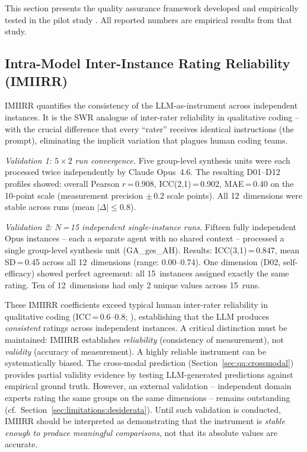 \documentclass[11pt,a4paper]{article}
\begin{document}
This section presents the quality assurance framework developed and empirically tested in the pilot study \citep{Geiger2026PaperA}. All reported numbers are empirical results from that study.


\subsection{Intra-Model Inter-Instance Rating Reliability (IMIIRR)}
\label{sec:qa:imiirr}

IMIIRR quantifies the consistency of the LLM-as-instrument across independent instances. It is the SWR analogue of inter-rater reliability in qualitative coding -- with the crucial difference that every ``rater'' receives identical instructions (the prompt), eliminating the implicit variation that plagues human coding teams.

\emph{Validation 1: $5 \times 2$ run convergence.} Five group-level synthesis units were each processed twice independently by Claude Opus~4.6. The resulting D01--D12 profiles showed: overall Pearson $r$\,=\,0.908, ICC(2,1)\,=\,0.902, MAE\,=\,0.40 on the 10-point scale (measurement precision $\pm$\,0.2 scale points). All 12~dimensions were stable across runs (mean $|\Delta| \leq 0.8$).

\emph{Validation 2: $N$\,=\,15 independent single-instance runs.} Fifteen fully independent Opus instances -- each a separate agent with no shared context -- processed a single group-level synthesis unit (GA\_ges\_AH). Results: ICC(3,1)\,=\,0.847, mean SD\,=\,0.45 across all 12~dimensions (range: 0.00--0.74). One dimension (D02, self-efficacy) showed perfect agreement: all 15~instances assigned exactly the same rating. Ten of 12~dimensions had only 2 unique values across 15~runs.

These IMIIRR coefficients exceed typical human inter-rater reliability in qualitative coding (ICC\,=\,0.6--0.8; \citealp{Hallgren2012}), establishing that the LLM produces \emph{consistent} ratings across independent instances. A critical distinction must be maintained: IMIIRR establishes \emph{reliability} (consistency of measurement), not \emph{validity} (accuracy of measurement). A highly reliable instrument can be systematically biased. The cross-modal prediction (Section~\ref{sec:qa:crossmodal}) provides partial validity evidence by testing LLM-generated predictions against empirical ground truth. However, an external validation -- independent domain experts rating the same groups on the same dimensions -- remains outstanding (cf.\ Section~\ref{sec:limitations:desiderata}). Until such validation is conducted, IMIIRR should be interpreted as demonstrating that the instrument is \emph{stable enough to produce meaningful comparisons}, not that its absolute values are accurate.
\end{document}
